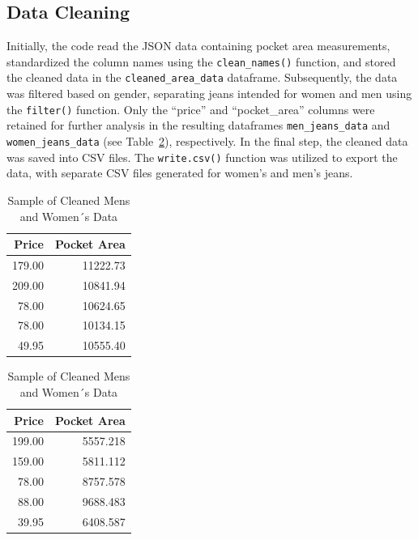 \documentclass[
  letterpaper,
  DIV=11,
  numbers=noendperiod]{scrartcl}
\begin{document}
\hypertarget{data-cleaning}{%
\subsection{Data Cleaning}\label{data-cleaning}}

Initially, the code read the JSON data containing pocket area
measurements, standardized the column names using the
\texttt{clean\_names()} function, and stored the cleaned data in the
\texttt{cleaned\_area\_data} dataframe. Subsequently, the data was
filtered based on gender, separating jeans intended for women and men
using the \texttt{filter()} function. Only the ``price'' and
``pocket\_area'' columns were retained for further analysis in the
resulting dataframes \texttt{men\_jeans\_data} and
\texttt{women\_jeans\_data} (see Table~\ref{tbl-menwomen_table}),
respectively. In the final step, the cleaned data was saved into CSV
files. The \texttt{write.csv()} function was utilized to export the
data, with separate CSV files generated for women's and men's jeans.

\begin{table}

\caption{\label{tbl-menwomen_table}Sample of Cleaned
Men\textquotesingle s and Women´s
Data}\begin{minipage}[t]{0.50\linewidth}

{\centering 

\begin{tabular}[t]{rr}
\toprule
Price & Pocket Area\\
\midrule
179.00 & 11222.73\\
209.00 & 10841.94\\
78.00 & 10624.65\\
78.00 & 10134.15\\
49.95 & 10555.40\\
\bottomrule
\end{tabular}

}

\end{minipage}%
%
\begin{minipage}[t]{0.50\linewidth}

{\centering 

\begin{tabular}[t]{rr}
\toprule
Price & Pocket Area\\
\midrule
199.00 & 5557.218\\
159.00 & 5811.112\\
78.00 & 8757.578\\
88.00 & 9688.483\\
39.95 & 6408.587\\
\bottomrule
\end{tabular}

}

\end{minipage}%

\end{table}
\end{document}
